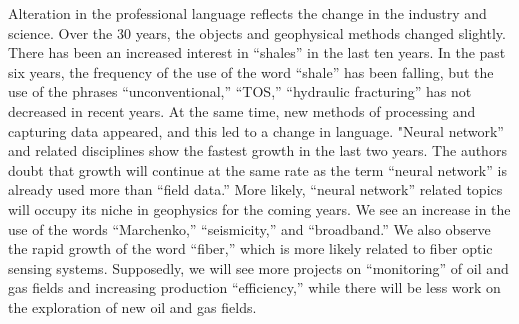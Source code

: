 \documentclass[geosciences,article,submit,moreauthors,pdftex]{Definitions/mdpi}
\begin{document}
Alteration in the professional language reflects the change in the industry and science. Over the 30 years, the objects and geophysical methods changed slightly. There has been an increased interest in ``shales'' in the last ten years. In the past six years, the frequency of the use of the word ``shale'' has been falling, but the use of the phrases ``unconventional,'' ``TOS,'' ``hydraulic fracturing'' has not decreased in recent years. At the same time, new methods of processing and capturing data appeared, and this led to a change in language. "Neural network'' and related disciplines show the fastest growth in the last two years. The authors doubt that growth will continue at the same rate as the term ``neural network'' is already used more than ``field data.'' More likely, ``neural network'' related topics will occupy its niche in geophysics for the coming years. We see an increase in the use of the words ``Marchenko,'' ``seismicity,'' and ``broadband.'' We also observe the rapid growth of the word ``fiber,'' which is more likely related to fiber optic sensing systems. Supposedly, we will see more projects on ``monitoring'' of oil and gas fields and increasing production ``efficiency,'' while there will be less work on the exploration of new oil and gas fields.


\vspace{6pt} 



\end{document}
